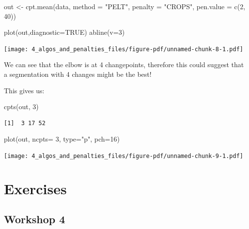 \documentclass[
  letterpaper,
  DIV=11,
  numbers=noendperiod]{scrreprt}
\newenvironment{Shaded}{\begin{snugshade}}{\end{snugshade}}
\newcommand{\AttributeTok}[1]{\textcolor[rgb]{0.40,0.45,0.13}{#1}}
\newcommand{\ConstantTok}[1]{\textcolor[rgb]{0.56,0.35,0.01}{#1}}
\newcommand{\DecValTok}[1]{\textcolor[rgb]{0.68,0.00,0.00}{#1}}
\newcommand{\FunctionTok}[1]{\textcolor[rgb]{0.28,0.35,0.67}{#1}}
\newcommand{\NormalTok}[1]{\textcolor[rgb]{0.00,0.23,0.31}{#1}}
\newcommand{\OtherTok}[1]{\textcolor[rgb]{0.00,0.23,0.31}{#1}}
\newcommand{\StringTok}[1]{\textcolor[rgb]{0.13,0.47,0.30}{#1}}
\begin{document}
\begin{Shaded}
\begin{Highlighting}[]
\NormalTok{out }\OtherTok{\textless{}{-}} \FunctionTok{cpt.mean}\NormalTok{(data, }\AttributeTok{method =} \StringTok{"PELT"}\NormalTok{, }\AttributeTok{penalty  =} \StringTok{"CROPS"}\NormalTok{, }\AttributeTok{pen.value =} \FunctionTok{c}\NormalTok{(}\DecValTok{2}\NormalTok{, }\DecValTok{40}\NormalTok{))}

\FunctionTok{plot}\NormalTok{(out,}\AttributeTok{diagnostic=}\ConstantTok{TRUE}\NormalTok{)}
\FunctionTok{abline}\NormalTok{(}\AttributeTok{v=}\DecValTok{3}\NormalTok{)}
\end{Highlighting}
\end{Shaded}

\texttt{[image: 4\_algos\_and\_penalties\_files/figure-pdf/unnamed-chunk-8-1.pdf]}

We can see that the elbow is at 4 changepoints, therefore this could
suggest that a segmentation with 4 changes might be the best!

This gives us:

\begin{Shaded}
\begin{Highlighting}[]
\FunctionTok{cpts}\NormalTok{(out, }\DecValTok{3}\NormalTok{)}
\end{Highlighting}
\end{Shaded}

\begin{verbatim}
[1]  3 17 52
\end{verbatim}

\begin{Shaded}
\begin{Highlighting}[]
\FunctionTok{plot}\NormalTok{(out, }\AttributeTok{ncpts=} \DecValTok{3}\NormalTok{, }\AttributeTok{type=}\StringTok{"p"}\NormalTok{, }\AttributeTok{pch=}\DecValTok{16}\NormalTok{)}
\end{Highlighting}
\end{Shaded}

\texttt{[image: 4\_algos\_and\_penalties\_files/figure-pdf/unnamed-chunk-9-1.pdf]}

\section{Exercises}\label{exercises-3}

\subsection{Workshop 4}\label{workshop-4}
\end{document}
